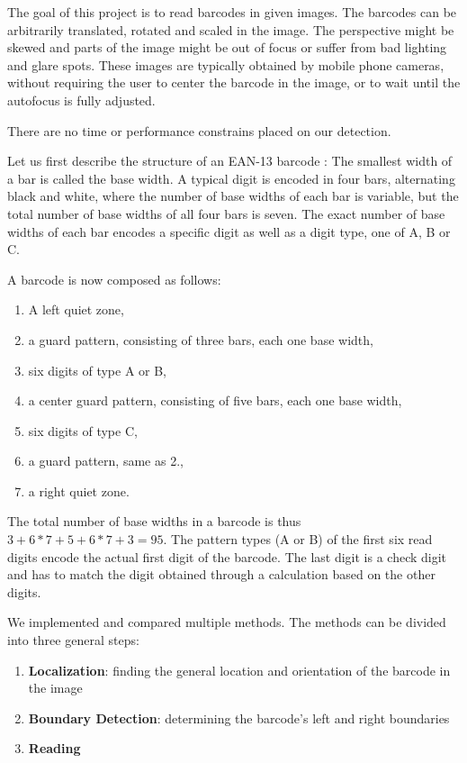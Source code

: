 The goal of this project is to read barcodes in given images. The barcodes can
be arbitrarily translated, rotated and scaled in the image. The perspective
might be skewed and parts of the image might be out of focus or suffer from bad
lighting and glare spots. These images are typically obtained by mobile phone
cameras, without requiring the user to center the barcode in the image, or to
wait until the autofocus is fully adjusted.

There are no time or performance constrains placed on our detection.

Let us first describe the structure of an EAN-13 barcode \cite{GS12017}:
The smallest width of a bar is called the base width. A typical digit is encoded
in four bars, alternating black and white, where the number of base widths
of each bar is variable, but the total number of base widths of all four bars is seven.
The exact number of base widths of each bar encodes a specific digit as well as a digit
type, one of A, B or C.

A barcode is now composed as follows:
\begin{enumerate}
\item A left quiet zone,
\item a guard pattern, consisting of three bars, each one base width,
\item six digits of type A or B,
\item a center guard pattern, consisting of five bars, each one base width,
\item six digits of type C,
\item a guard pattern, same as 2.,
\item a right quiet zone.
\end{enumerate}

The total number of base widths in a barcode is thus $3 + 6*7 + 5 + 6*7 + 3=95$.
The pattern types (A or B) of the first six read digits encode the actual first
digit of the barcode. The last digit is a check digit and has to match the digit
obtained through a calculation based on the other digits.

We implemented and compared multiple methods. The methods can be divided into
three general steps:
\begin{enumerate}
\item \textbf{Localization}: finding the general location and orientation of the barcode
  in the image
\item \textbf{Boundary Detection}: determining the barcode's left and right boundaries
\item \textbf{Reading}
\end{enumerate}

